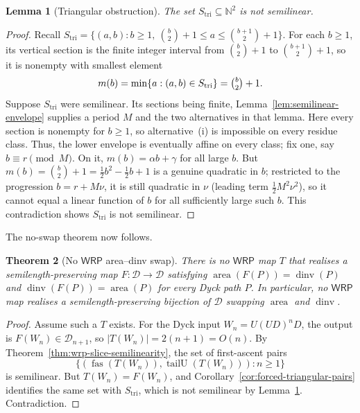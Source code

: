 \documentclass[11pt]{article}
\newtheorem{theorem}{Theorem}[section]
\newtheorem{lemma}[theorem]{Lemma}
\theoremstyle{definition}
\newcommand{\D}{\mathcal D}
\newcommand{\N}{\mathbb N}
\newcommand{\WRP}{\mathsf{WRP}}
\newcommand{\area}{\operatorname{area}}
\newcommand{\dinv}{\operatorname{dinv}}
\newcommand{\fas}{\operatorname{fas}}
\newcommand{\tailU}{\operatorname{tailU}}
\begin{document}
\begin{lemma}[Triangular obstruction]
\label{lem:triangular-not-semilinear}
The set $S_{\mathrm{tri}}\subseteq\N^2$ is not semilinear.
\end{lemma}

\begin{proof}
Recall $S_{\mathrm{tri}}=\{(a,b):b\ge 1,\ \binom b2+1\le a\le\binom{b+1}2+1\}$.
For each $b\ge 1$, its vertical section is the finite integer interval from
$\binom b2+1$ to $\binom{b+1}2+1$, so it is nonempty with smallest element
\[
   m(b)=\min\{a:(a,b)\in S_{\mathrm{tri}}\}=\tbinom b2+1.
\]
Suppose $S_{\mathrm{tri}}$ were semilinear.  Its sections being finite,
Lemma~\ref{lem:semilinear-envelope} supplies a period $M$ and the two
alternatives in that lemma.  Here every section is nonempty for $b\ge1$, so
alternative~(i) is impossible on every residue class.  Thus, the lower envelope
is eventually affine on every class; fix one, say $b\equiv r\pmod M$.  On it,
$m(b)=\alpha b+\gamma$ for all large $b$.  But
$m(b)=\binom b2+1=\tfrac12 b^2-\tfrac12 b+1$ is a genuine quadratic in $b$;
restricted to the progression $b=r+M\nu$, it is still quadratic in $\nu$
(leading term $\tfrac12 M^2\nu^2$), so it cannot equal a linear function of
$b$ for all sufficiently large such $b$.  This contradiction shows
$S_{\mathrm{tri}}$ is not semilinear.
\end{proof}

The no-swap theorem now follows.

\begin{theorem}[No $\WRP$ area--dinv swap]\label{thm:wrp-no-swap}
There is no $\WRP$ map $T$ that realises a
semilength-preserving map $F\colon\D\to\D$ satisfying
$\area(F(P))=\dinv(P)$ and $\dinv(F(P))=\area(P)$
for every Dyck path $P$.  In particular, no $\WRP$ map realises a
semilength-preserving \emph{bijection} of $\D$ swapping $\area$ and $\dinv$.
\end{theorem}

\begin{proof}
Assume such a $T$ exists.  For the Dyck input $W_n=U(UD)^nD$, the output
is $F(W_n)\in\D_{n+1}$, so $|T(W_n)|=2(n+1)=O(n)$.  By
Theorem~\ref{thm:wrp-slice-semilinearity}, the set of first-ascent pairs
\[
   \{(\fas(T(W_n)),\tailU(T(W_n))):n\ge 1\}
\]
is semilinear.  But $T(W_n)=F(W_n)$, and
Corollary~\ref{cor:forced-triangular-pairs} identifies the same set
with $S_{\mathrm{tri}}$, which is not semilinear by
Lemma~\ref{lem:triangular-not-semilinear}.  Contradiction.
\end{proof}
\end{document}
